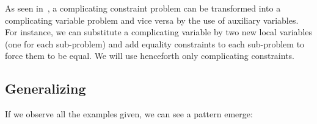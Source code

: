 \documentclass[../main.tex]{subfiles}
\begin{document}
\begin{remark}
  As seen in~\cite{BoydEtAl2015}, a complicating constraint problem can be transformed into a complicating variable problem and vice versa by the use of auxiliary variables.
  For instance, we can substitute a complicating variable by two new local variables (one for each sub-problem) and add equality constraints to each sub-problem to force them to be equal.
  We will use henceforth only complicating constraints.
\end{remark}

\subsection{Generalizing}
If we observe all the examples given, we can see a pattern emerge:
\end{document}
